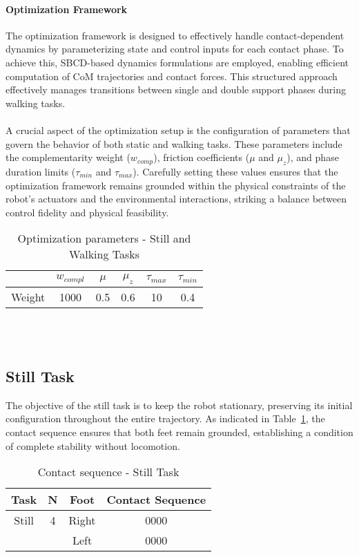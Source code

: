 \documentclass[main.tex]{subfiles}
\begin{document}
\begin{sloppypar}
\paragraph{Optimization Framework} The optimization framework is designed to effectively handle contact-dependent dynamics by parameterizing state and control inputs for each contact phase. To achieve this, SBCD-based dynamics formulations are employed, enabling efficient computation of CoM trajectories and contact forces. This structured approach effectively manages transitions between single and double support phases during walking tasks.\\
\\
A crucial aspect of the optimization setup is the configuration of parameters that govern the behavior of both static and walking tasks. These parameters include the complementarity weight ($w_{comp}$), friction coefficients ($\mu$ and $\mu_z$), and phase duration limits ($\tau_{min}$ and $\tau_{max}$). Carefully setting these values ensures that the optimization framework remains grounded within the physical constraints of the robot’s actuators and the environmental interactions, striking a balance between control fidelity and physical feasibility.
\begin{table}[h!]
    \centering
    \begin{tabular}{lccccc}
        \toprule
        & $w_{compl}$ & $\mu$ & $\mu_z$ & $\tau_{max}$ & $\tau_{min}$ \\
        \midrule 
        Weight & 1000 & 0.5 & 0.6 & 10 & 0.4 \\
        \bottomrule
    \end{tabular}
    \caption{Optimization parameters - Still and Walking Tasks}
\end{table}
\\
\\
\subsection{Still Task}  
The objective of the still task is to keep the robot stationary, preserving its initial configuration throughout the entire trajectory. As indicated in Table~\ref{tab:stilltask}, the contact sequence ensures that both feet remain grounded, establishing a condition of complete stability without locomotion.
\begin{table}[h!]
    \centering
    \begin{tabular}{|c|c|c|c|}
    \hline
    Task & N & Foot & Contact Sequence \\
    \hline
    Still & 4 & Right & 0000 \\
    & & Left & 0000 \\
    \hline
    \end{tabular}
    \caption{Contact sequence - Still Task}
    \label{tab:stilltask}
\end{table}

\end{sloppypar}
\end{document}
